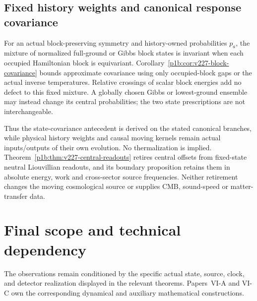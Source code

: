 \documentclass[12pt,a4paper]{article}
\begin{document}

\subsection{Fixed history weights and canonical response covariance}
\label{p9:sec:v227-history-covariance}
For an actual block-preserving symmetry and history-owned probabilities
$p_a$, the mixture of normalized full-ground or Gibbs block states is
invariant when each occupied Hamiltonian block is equivariant.
Corollary~\ref{p1b:cor:v227-block-covariance} bounds approximate covariance
using only occupied-block gaps or the actual inverse temperatures.
Relative crossings of scalar block energies add no defect to this fixed
mixture. A globally chosen Gibbs or lowest-ground ensemble may instead
change its central probabilities; the two state prescriptions are not
interchangeable.

Thus the state-covariance antecedent is derived on the stated canonical
branches, while physical history weights and causal moving kernels remain
actual inputs/outputs of their own evolution. No thermalization is implied.
Theorem~\ref{p1b:thm:v227-central-readouts} retires central offsets from
fixed-state neutral Liouvillian readouts, and its boundary proposition
retains them in absolute energy, work and cross-sector source frequencies.
Neither retirement changes the moving cosmological source or supplies
CMB, sound-speed or matter-transfer data.




\section*{Final scope and technical dependency}
The observations remain conditioned by the specific actual state, source, clock, and detector realization displayed in the relevant theorems. Papers~VI-A and VI-C own the corresponding dynamical and auxiliary mathematical constructions.
\end{document}
